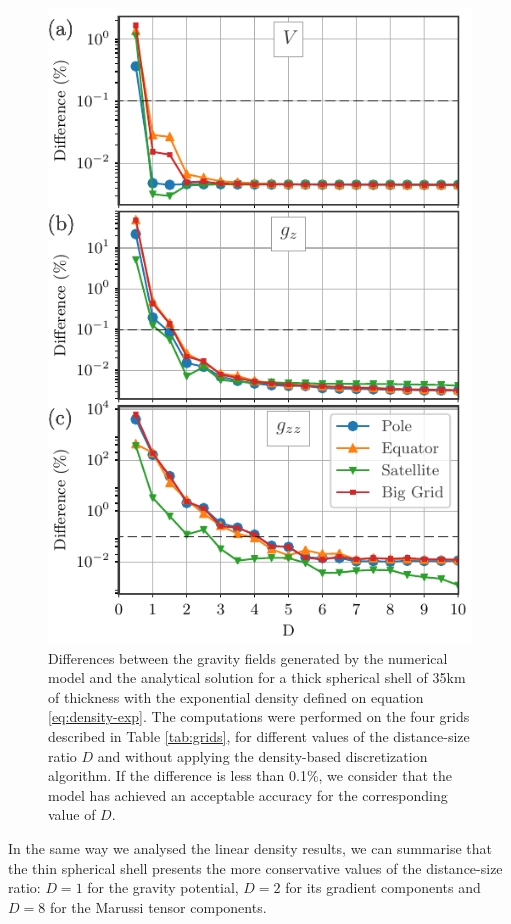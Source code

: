 \documentclass[extra]{gji}
\begin{document}
\begin{figure}
\centering
\includegraphics[width=0.9\linewidth]{figures/exponential-D-thick.pdf}
\caption{
    Differences between the gravity fields generated by the numerical model and the analytical solution for a thick spherical shell of 35km of thickness with the exponential density defined on equation \ref{eq:density-exp}. The computations were performed on the four grids described in Table \ref{tab:grids}, for different values of the distance-size ratio $D$ and without applying the density-based discretization algorithm. If the difference is less than 0.1\%, we consider that the model has achieved an acceptable accuracy for the corresponding value of $D$.
}
\label{fig:D-exp-thick}
\end{figure}

In the same way we analysed the linear density results, we can summarise that the thin spherical shell presents the more conservative values of the distance-size ratio: $D=1$ for the gravity potential, $D=2$ for its gradient components and $D=8$ for the Marussi tensor components.
\end{document}
